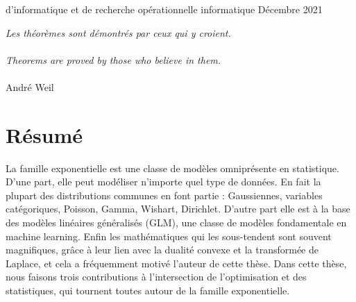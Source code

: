 \documentclass[12pt]{report} %
\numberwithin{equation}{chapter}
\numberwithin{table}{chapter}
\numberwithin{figure}{chapter}
\begin{document}




    {}
    {d'informatique et de recherche op\'{e}rationnelle}
    {informatique}
    {Décembre}
    {2021}

\PagesCouverture
\newpage
 \begin{flushright} 
 \emph{Les théorèmes sont démontrés par ceux qui y croient.}\\~\\
 \emph{Theorems are proved by those who believe in them.}  \\~\\
André Weil 
 \end{flushright}
 
 

\chapter*{Résumé}
La famille exponentielle est une classe de modèles omniprésente en statistique.
D'une part, elle  peut modéliser n'importe quel type de données. 
En fait la plupart des distributions communes en font partie : Gaussiennes, variables catégoriques, Poisson, Gamma, Wishart, Dirichlet. 
D'autre part elle est à la base des modèles linéaires généralisés (GLM), une classe de modèles fondamentale en machine learning. 
Enfin les mathématiques qui les sous-tendent sont souvent magnifiques, grâce à leur lien avec la dualité convexe et la transformée de Laplace,  et cela a fréquemment motivé l'auteur de cette thèse.
Dans cette thèse, nous faisons trois contributions à l'intersection de l'optimisation et des statistiques, qui tournent toutes autour de la famille exponentielle. 
\end{document}
